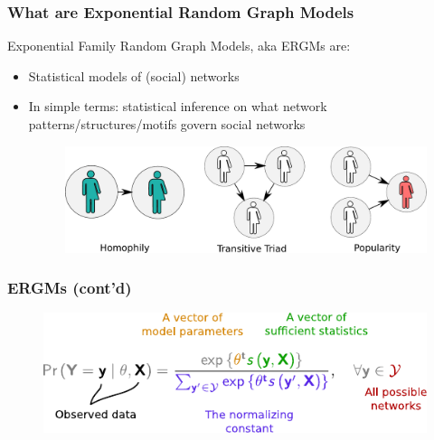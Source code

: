 \documentclass[aspectratio=169, 9pt]{beamer}\usepackage[]{graphicx}\usepackage[]{color}
\begin{document}
\begin{frame}
\frametitle{What are Exponential Random Graph Models}

Exponential Family Random Graph Models, aka \alert{ERGMs} are:\pause

\begin{itemize}[<+->]
\item Statistical models of (social) networks
\item In simple terms: statistical inference on what network patterns/structures/motifs
govern social networks
\begin{figure}
\includegraphics[width=.6\linewidth]{friendly-terms.pdf}
\end{figure}
\end{itemize}

\end{frame}

\begin{frame}[label=ergmeq]
\frametitle{ERGMs (cont'd)}
\begin{figure}
\centering
\includegraphics[width=.7\linewidth]{parts-of-ergm.pdf}
\end{figure}


\vfill\hfill \hyperlink{ergmterms}{}
\end{frame}
\end{document}

